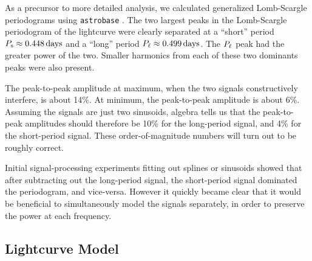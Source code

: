 \documentclass[12pt,twocolumn,tighten]{aastex62}
\begin{document}
As a precursor to more detailed analysis, we calculated generalized
Lomb-Scargle periodograms using \texttt{astrobase}
\citep{lomb_1976,scargle_studies_1982,vanderplas_periodograms_2015,bhatti_astrobase_2018}.
The two largest peaks in the Lomb-Scargle periodogram of the
lightcurve were clearly separated at a ``short'' period $P_{\rm s}
\approx 0.448\,{\rm days}$ and a ``long'' period $P_{\rm \ell} \approx
0.499\,{\rm days}$.  The $P_{\rm \ell}$ peak had the greater power of
the two.  Smaller harmonics from each of these two dominants peaks
were also present.


The peak-to-peak amplitude at maximum, when the two signals
constructively interfere, is about 14\%.  At minimum, the peak-to-peak
amplitude is about 6\%.  Assuming the signals are just two sinusoids,
algebra tells us that the peak-to-peak amplitudes should therefore be
10\% for the long-period signal, and 4\% for the short-period signal.
These order-of-magnitude numbers will turn out to be roughly correct.

Initial signal-processing experiments fitting out splines or sinusoids
showed that after subtracting out the long-period signal, the
short-period signal dominated the periodogram, and vice-versa.
However it quickly became clear that it would be beneficial to
simultaneously model the signals separately, in order to preserve the
power at each frequency.




\subsection{Lightcurve Model}
\end{document}
